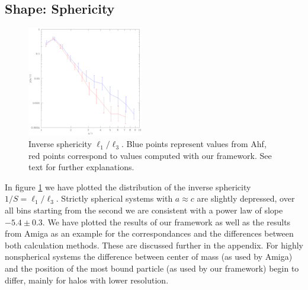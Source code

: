 \documentclass[useAMS,usenatbib]{mn2e}
\begin{document}
\subsection{Shape: Sphericity}
%
%
\begin{figure}
  \begin{center}
    \includegraphics[width=0.45\textwidth]{fig/aoverc/out.eps}
  \end{center}

  \caption{ \label{fig:aoverc} Inverse sphericity $\ell_1/\ell_3$. Blue points
    represent values from {\sc Ahf}, red points correspond to values computed
    with our framework. See text for further explanations.}
\end{figure}
%
%
In figure \ref{fig:aoverc} we have plotted the distribution of the inverse
sphericity $1/S=\ell_{1}/\ell_{3}$. Strictly spherical systems with $a\approx
c$ are slightly depressed, over all bins starting from the second we are
consistent with a power law of slope $-5.4\pm0.3$.  We have plotted the
results of our framework as well as the results from {\sc Amiga} as an example
for the correspondances and the differences between both calculation
methods. These are discussed further in the appendix. For highly nonspherical
systems the difference between center of mass (as used by {\sc Amiga}) and the
position of the most bound particle (as used by our framework) begin to
differ, mainly for halos with lower resolution.
%
\end{document}
